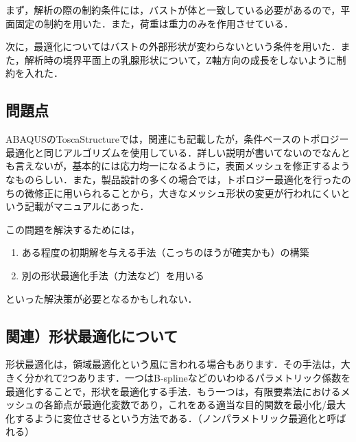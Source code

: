 \documentclass[11pt]{jsarticle}
\begin{document}
			まず，解析の際の制約条件には，バストが体と一致している必要があるので，平面固定の制約を用いた．また，荷重は重力のみを作用させている．
			
			次に，最適化についてはバストの外部形状が変わらないという条件を用いた．また，解析時の境界平面上の乳腺形状について，Z軸方向の成長をしないように制約を入れた．
			
			\subsection{問題点}
			ABAQUSのToscaStructureでは，関連にも記載したが，条件ベースのトポロジー最適化と同じアルゴリズムを使用している．詳しい説明が書いてないのでなんとも言えないが，基本的には応力均一になるように，表面メッシュを修正するようなものらしい．また，製品設計の多くの場合では，トポロジー最適化を行ったのちの微修正に用いられることから，大きなメッシュ形状の変更が行われにくいという記載がマニュアルにあった．
			
			この問題を解決するためには，
			\begin{enumerate}
				\item ある程度の初期解を与える手法（こっちのほうが確実かも）の構築
				\item 別の形状最適化手法（力法など）を用いる
			\end{enumerate}
			といった解決策が必要となるかもしれない．
			
			\subsection{関連）形状最適化について}
				形状最適化は，領域最適化という風に言われる場合もあります．その手法は，大きく分かれて2つあります．一つはB-splineなどのいわゆるパラメトリック係数を最適化することで，形状を最適化する手法．もう一つは，有限要素法におけるメッシュの各節点が最適化変数であり，これをある適当な目的関数を最小化/最大化するように変位させるという方法である．（ノンパラメトリック最適化と呼ばれる）
				
\end{document}
